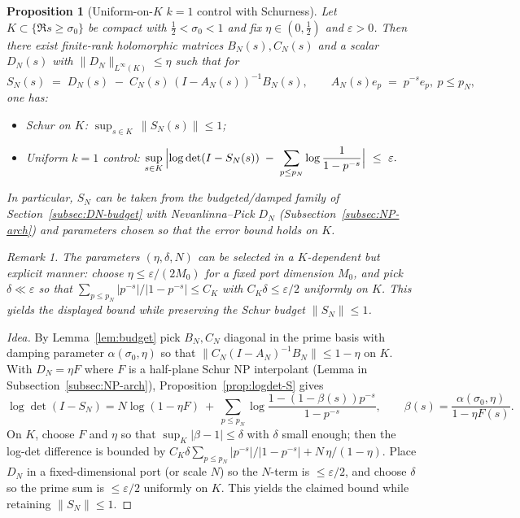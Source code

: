 \documentclass[11pt]{article}
\newtheorem{proposition}[theorem]{Proposition}
\theoremstyle{definition}
\theoremstyle{remark}
\newtheorem{remark}[theorem]{Remark}
\begin{document}
\begin{proposition}[Uniform-on-$K$ $k=1$ control with Schurness]\label{prop:K1-approx}
Let $K\subset\{\Re s\ge\sigma_0\}$ be compact with $\tfrac12<\sigma_0<1$ and fix $\eta\in(0,\tfrac12)$ and $\varepsilon>0$. Then there exist finite-rank holomorphic matrices $B_N(s),C_N(s)$ and a scalar $D_N(s)$ with $\|D_N\|_{L^{\infty}(K)}\le\eta$ such that for
\[
 S_N(s)\;=\;D_N(s)\; -\; C_N(s)\,(I-A_N(s))^{-1}B_N(s),\qquad A_N(s)e_p\;=\;p^{-s}e_p,\ p\le p_N,
\]
one has:
\begin{itemize}
 \item Schur on $K$: $\displaystyle\sup_{s\in K}\,\|S_N(s)\|\le 1$;
 \item Uniform $k=1$ control: $\displaystyle\sup_{s\in K}\,\Bigl|\log\det(I-S_N(s))\; -\;\sum_{p\le p_N}\log\frac{1}{1-p^{-s}}\Bigr|\ \le\ \varepsilon.$
\end{itemize}
In particular, $S_N$ can be taken from the budgeted/damped family of Section~\ref{subsec:DN-budget} with Nevanlinna--Pick $D_N$ (Subsection~\ref{subsec:NP-arch}) and parameters chosen so that the error bound holds on $K$.
\begin{remark}
The parameters $(\eta,\delta,N)$ can be selected in a $K$-dependent but explicit manner: choose $\eta\le \varepsilon/(2M_0)$ for a fixed port dimension $M_0$, and pick $\delta\ll \varepsilon$ so that $\sum_{p\le p_N} |p^{-s}|/|1-p^{-s}|\le C_K$ with $C_K\delta\le \varepsilon/2$ uniformly on $K$. This yields the displayed bound while preserving the Schur budget $\|S_N\|\le 1$.
\end{remark}
\end{proposition}
\begin{proof}[Idea]
By Lemma~\ref{lem:budget} pick $B_N,C_N$ diagonal in the prime basis with damping parameter $\alpha(\sigma_0,\eta)$ so that $\|C_N(I-A_N)^{-1}B_N\|\le 1-\eta$ on $K$. With $D_N=\eta F$ where $F$ is a half-plane Schur NP interpolant (Lemma in Subsection~\ref{subsec:NP-arch}), Proposition~\ref{prop:logdet-S} gives
\[
 \log\det(I-S_N)=N\log(1-\eta F)\ +\ \sum_{p\le p_N}\log\frac{1-(1-\beta(s))p^{-s}}{1-p^{-s}},\qquad \beta(s)=\frac{\alpha(\sigma_0,\eta)}{1-\eta F(s)}.
\]
On $K$, choose $F$ and $\eta$ so that $\sup_K|\beta-1|\le\delta$ with $\delta$ small enough; then the log-det difference is bounded by $C_K\delta\sum_{p\le p_N}|p^{-s}|/|1-p^{-s}|+N\,\eta/(1-\eta)$. Place $D_N$ in a fixed-dimensional port (or scale $N$) so the $N$-term is $\le \varepsilon/2$, and choose $\delta$ so the prime sum is $\le\varepsilon/2$ uniformly on $K$. This yields the claimed bound while retaining $\|S_N\|\le 1$.
\end{proof}
\end{document}
